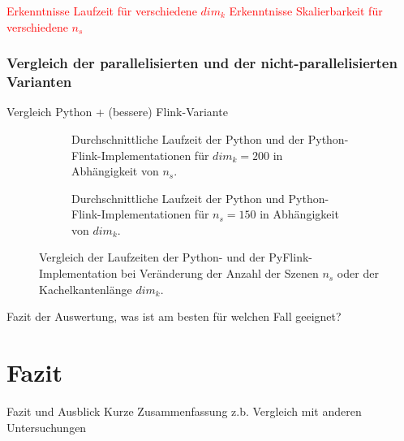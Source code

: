 \textcolor{red}{Erkenntnisse Laufzeit für verschiedene $dim_k$}
\textcolor{red}{Erkenntnisse Skalierbarkeit für verschiedene $n_s$}

\subsection{Vergleich der parallelisierten und der nicht-parallelisierten Varianten}
Vergleich Python + (bessere) Flink-Variante

\begin{figure}
\captionsetup[subfigure]{justification=centering}
\centering
	\begin{subfigure}{.45\textwidth}
		\centering
		\caption{Durchschnittliche Laufzeit der Python und der Python-Flink-Implementationen für $dim_k = 200$ in Abhängigkeit von $n_s$.}
  		\label{fig:diagrammPythonFlinkNS}
	\end{subfigure}\hfill
	\begin{subfigure}{.45\textwidth}
  		\centering
		\caption{Durchschnittliche Laufzeit der Python und Python-Flink-Implementationen für $n_s = 150$ in Abhängigkeit von $dim_k$.}
  		\label{fig:diagrammPythonFlinkDimK}
	\end{subfigure}
\caption{Vergleich der Laufzeiten der Python- und der PyFlink-Implementation bei Veränderung der Anzahl der Szenen $n_s$ oder der Kachelkantenlänge $dim_k$.}
\label{fig:diagrammsPythonFlink}
\end{figure}

Fazit der Auswertung, was ist am besten für welchen Fall geeignet?

\chapter{Fazit}
Fazit und Ausblick
Kurze Zusammenfassung
z.b. Vergleich mit anderen Untersuchungen

